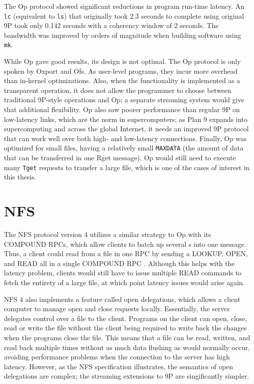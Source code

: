 \documentclass[11pt,american]{report}
\begin{document}
The Op protocol showed significant reductions in program run-time latency. An {\tt lc} (equivalent to {\tt ls}) that originally took 2.3 seconds to complete using original 9P took only 0.142 seconds with a coherency window of 2 seconds. The bandwidth was improved by orders of magnitude when building software using {\tt mk}.

While Op gave good results, its design is not optimal. The Op protocol is only spoken by Oxport and Ofs. As user-level programs, they incur more overhead than in-kernel optimizations. Also, when the functionality is implemented as a transparent operation, it does not allow the programmer to choose between traditional 9P-style operations and Op; a separate streaming system would give that additional flexibility. Op also saw poorer performance than regular 9P on low-latency links, which are the norm in supercomputers; as Plan 9 expands into supercomputing and across the global Internet, it needs an improved 9P protocol that can work well over both high- and low-latency connections. Finally, Op was optimized for small files, having a relatively small {\tt MAXDATA} (the amount of data that can be transferred in one Rget message). Op would still need to execute many {\tt Tget} requests to transfer a large file, which is one of the cases of interest in this thesis.

\section{NFS}
The NFS protocol version 4 utilizes a similar strategy to Op with its COMPOUND RPCs, which allow clients to batch up several s into one message. Thus, a client could read from a file in one RPC by sending a LOOKUP, OPEN, and READ all in a single COMPOUND RPC \cite{NFS4}. Although this helps with the latency problem, clients would still have to issue multiple READ commands to fetch the entirety of a large file, at which point latency issues would arise again.

NFS 4 also implements a feature called open delegations, which allows a client computer to manage open and close requests locally. Essentially, the server delegates control over a file to the client. Programs on the client can open, close, read or write the file without the client being required to write back the changes when the programs close the file. This means that a file can be read, written, and read back multiple times without as much data flushing as would normally occur, avoiding performance problems when the connection to the server has high latency. However, as the NFS specification illustrates, the semantics of open delegations are complex; the streaming extensions to 9P are singificantly simpler.
\end{document}
